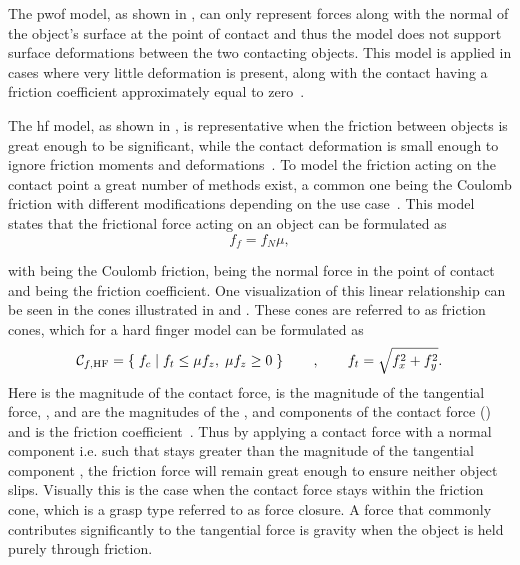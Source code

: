 The \gls{pwof} model, as shown in , can only represent forces along with the normal  of the object's surface at the point of contact and thus the model does not support surface deformations between the two contacting objects. This model is applied in cases where very little deformation is present, along with the contact having a friction coefficient approximately equal to zero~\cite[Chapter 38]{handbook-of-robotics}.\medskip


The \gls{hf} model, as shown in , is representative when the friction between objects is great enough to be significant, while the contact deformation is small enough to ignore friction moments and deformations~\cite[Chapter 38]{handbook-of-robotics}. To model the friction acting on the contact point a great number of methods exist, a common one being the Coulomb friction with different modifications depending on the use case~\cite{modelling-of-joint-friction-in-robotic-manipulators-with-gear-transmissions}. 
This model states that the frictional force acting on an object can be formulated as
%
\begin{equation}
	f_f = f_N \mu,
	\label{eq:coulomb-friction}
\end{equation}

with  being the Coulomb friction,  being the normal force in the point of contact and \mvar{\mu\in[0,1]} being the friction coefficient. One visualization of this linear relationship can be seen in the cones illustrated in  and . These cones are referred to as friction cones, which for a hard finger model can be formulated as
%
\begin{equation} 
	\mathcal{C}_{f,\text{HF}} = \left\{ \; f_c\; \middle|\; f_{t} \le \mu f_z,\; \mu f_z \ge 0 \; \right\} \qquad , \qquad f_t = \sqrt{f_x^2 + f_y^2}.
	\label{eq:hf}
\end{equation}
Here  is the magnitude of the contact force,  is the magnitude of the tangential force, ,  and  are the magnitudes of the ,  and  components of the contact force () and \mvar{\mu} is the friction coefficient~\cite[Chapter 37]{handbook-of-robotics}. 
Thus by applying a contact force with a normal component i.e.  such that  stays greater than the magnitude of the tangential component , the friction force will remain great enough to ensure neither object slips. Visually this is the case when the contact force  stays within the friction cone, which is a grasp type referred to as force closure. A force that commonly contributes significantly to the tangential force is gravity when the object is held purely through friction. \medskip

